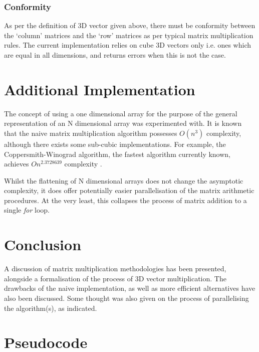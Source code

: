 \documentclass[journal,10pt]{IEEEtran}
\begin{document}
\subsubsection{Conformity}

As per the definition of 3D vector given above, there must be conformity between the `column' matrices and the `row' matrices as per typical matrix multiplication rules. The current implementation relies on cube 3D vectors only i.e. ones which are equal in all dimensions, and returns errors when this is not the case.

\section{Additional Implementation}
The concept of using a one dimensional array for the purpose of the general representation of an N dimensional array was experimented with. It is known that the naive matrix multiplication algorithm possesses $O(n^3)$ complexity, although there exists some sub-cubic implementations. For example, the Coppersmith-Winograd algorithm, the fastest algorithm currently known, achieves $O{n^{2.3728639}}$ complexity \cite{copper}.

Whilst the flattening of N dimensional arrays does not change the asymptotic complexity, it does offer potentially easier parallelisation of the matrix arithmetic procedures. At the very least, this collapses the process of matrix addition to a single \textit{for} loop.

\clearpage

\section{Conclusion}

A discussion of matrix multiplication methodologies has been presented, alongside a formalisation of the process of 3D vector multiplication. The drawbacks of the naive implementation, as well as more efficient alternatives have also been discussed. Some thought was also given on the process of parallelising the algorithm(s), as indicated.

\renewcommand*{\bibfont}{\small}

\printbibliography

\clearpage

\onecolumn
\section*{Pseudocode}
\end{document}
